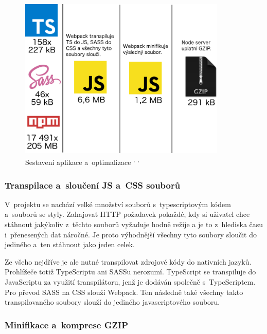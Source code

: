 \documentclass[a4paper,12pt]{article}
\begin{document}
\begin{figure}[H]
  \centering
  \includegraphics[width=280pt]{Images/Webpack.png}
  \caption[Sestavení aplikace a~optimalizace]{Sestavení aplikace a~optimalizace   \footnotemark[1]\textsuperscript{, }\footnotemark[2]\textsuperscript{, }\footnotemark[3]}
\end{figure}


\vspace*{-0.5cm}
\subsubsection{Transpilace a~sloučení JS a~CSS souborů}

V~projektu se nachází velké množství souborů s~typescriptovým kódem a~souborů se styly. Zahajovat HTTP požadavek pokaždé, kdy si uživatel chce stáhnout jakýkoliv z~těchto souborů vyžaduje hodně režije a je to z~hlediska času i~přenesených dat náročné. Je proto výhodnější všechny tyto soubory sloučit do jediného a~ten stáhnout jako jeden celek.

Ze všeho nejdříve je ale nutné transpilovat zdrojové kódy do nativních jazyků. Prohlížeče totiž TypeScriptu ani SASSu nerozumí. TypeScript se transpiluje do JavaScriptu za využití transpilátoru, jenž je dodáván společně s~TypeScriptem. Pro převod SASS na CSS slouží Webpack. Ten následně také všechny takto transpilovaného soubory slouží do jediného javascriptového souboru.

\subsubsection{Minifikace a~komprese GZIP}
\end{document}
